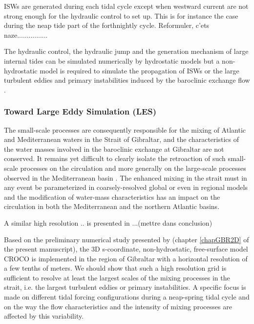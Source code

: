 ISWs are generated during each tidal cycle except when westward current are not strong enough for the hydraulic control to set up. This is for instance the case during the neap tide part of the forthnightly cycle\citep{watson_1990,garcialafuente_2000}. \color{red}Reformuler, c'ets naze................\color{black}

The hydraulic control, the hydraulic jump and the generation mechanism of large internal tides can be simulated numerically by hydrostatic models but a non-hydrostatic model is required to simulate the propagation of ISWs or the large turbulent eddies and primary instabilities induced by the baroclinic exchange flow \citep{brandt_1996,vlasenko_2009}.



\subsubsection{Toward Large Eddy Simulation (LES)}

The small-scale processes are consequently responsible for the mixing of Atlantic and Mediterranean waters in the Strait of Gibraltar, and the characteristics of the water masses involved in the baroclinic exchange at Gibraltar are not conserved. It remains yet difficult to clearly isolate the retroaction of such small-scale processes on the circulation and more generally on the large-scale processes observed in the Mediterranean basin \citep{garcia-lafuente2017}.
The enhanced mixing in the strait must in any event be parameterized in coarsely-resolved global or even in regional models and the modification of water-mass characteristics has an impact on the circulation in both the Mediterranean and the northern Atlantic basins. 


\color{red}A similar high resolution .. is presented in ...(mettre dans conclusion)\color{black}

Based on the preliminary numerical study presented by \citet{hilt_2020} (chapter \ref{chapGBR2D} of the present manuscript), the 3D s-coordinate, non-hydrostatic, free-surface model CROCO is implemented in the region of Gibraltar with a horizontal resolution of a few tenths of meters. We should show that such a high resolution grid is sufficient to resolve at least the largest scales of the mixing processes in the strait, i.e. the largest turbulent eddies or primary instabilities. A specific focus is made on different tidal forcing configurations during a neap-spring tidal cycle and on the way the flow characteristics and the intensity of mixing processes are affected by this variability. 

